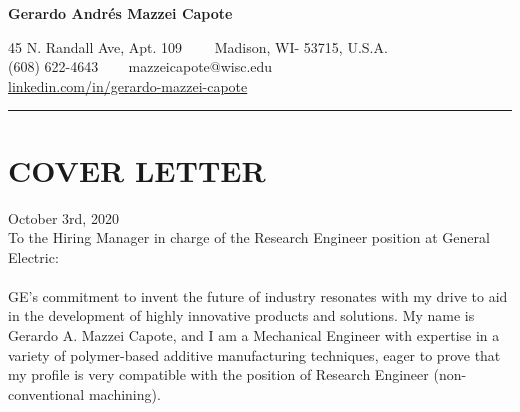 \documentclass[12pt,letterpaper]{article}
\begin{document}
\begin{center}
	{\LARGE \textbf{Gerardo Andrés Mazzei Capote}}

	45 N. Randall Ave, Apt. 109\ \ \textbullet
	\ \ Madison, WI- 53715, U.S.A.
	\\
	(608) 622-4643 \ \textbullet
	\ \ mazzeicapote@wisc.edu\\
	\href{https://www.linkedin.com/in/gerardo-mazzei-capote}{linkedin.com/in/gerardo-mazzei-capote}
	
\end{center}
\vspace{-0.5em}
\hrule
\vspace{0.4em}
\vspace{-1em}

\section*{COVER LETTER}
\vspace{0.4em}
October 3rd, 2020
\\
To the Hiring Manager in charge of the Research Engineer position at General Electric:
\\
\\
GE's commitment to invent the future of industry resonates with my drive to aid in the development of highly innovative products and solutions. My name is Gerardo A. Mazzei Capote, and I am a Mechanical Engineer with expertise in a variety of polymer-based additive manufacturing techniques, eager to prove that my profile is very compatible with the position of Research Engineer (non-conventional machining).
\end{document}

